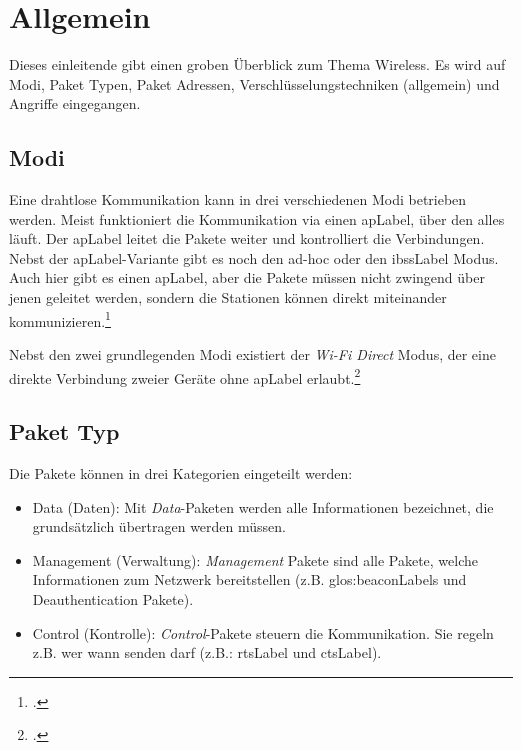 
\chapter{Allgemein}
\label{ch:general}
Dieses einleitende  gibt einen groben Überblick zum Thema Wireless. Es wird auf Modi, Paket Typen, Paket Adressen, Verschlüsselungstechniken (allgemein) und Angriffe eingegangen.

\section{Modi}
Eine drahtlose Kommunikation kann in drei verschiedenen Modi betrieben werden.
Meist funktioniert die Kommunikation via einen \gls{apLabel}, über den alles läuft. Der \gls{apLabel} leitet die Pakete weiter und kontrolliert die Verbindungen.
Nebst der \gls{apLabel}-Variante gibt es noch den ad-hoc oder den \gls{ibssLabel} Modus. Auch hier gibt es einen \gls{apLabel}, aber die Pakete müssen nicht zwingend über jenen geleitet werden, sondern die Stationen können direkt miteinander kommunizieren.\footcite[][38]{WrightCache201503}

Nebst den zwei grundlegenden Modi existiert der \textit{Wi-Fi Direct} Modus, der eine direkte Verbindung zweier Geräte ohne \gls{apLabel} erlaubt.\footcite{WiFi_Direct_Wikipedia_the_free_encyclopedia_2015-04-17}

\section{Paket Typ}
Die Pakete können in drei Kategorien eingeteilt werden:
\begin{itemize}
	\item Data (Daten): Mit \textit{Data}-Paketen werden alle Informationen bezeichnet, die grundsätzlich übertragen werden müssen.
	\item Management (Verwaltung): \textit{Management} Pakete sind alle Pakete, welche Informationen zum Netzwerk bereitstellen (z.B. \glspl{glos:beaconLabel} und Deauthentication Pakete).
	\item Control (Kontrolle): \textit{Control}-Pakete steuern die Kommunikation. Sie regeln z.B. wer wann senden darf (z.B.: \gls{rtsLabel} und \gls{ctsLabel}).
\end{itemize}

